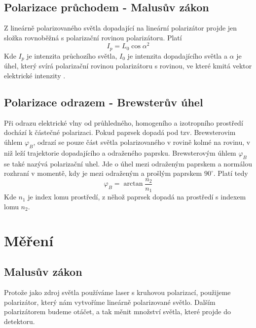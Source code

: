 \documentclass{article}
\begin{document}
\subsection*{Polarizace průchodem - Malusův zákon}
Z lineárně polarizovaného světla dopadající na lineární polarizátor projde jen složka rovnoběžná s polarizační rovinou polarizátoru.
Platí
\begin{equation}
    I_p=L_0\cos{\alpha}^2
    \label{malus}
\end{equation}
Kde \(I_p\) je intenzita průchozího světla, \(I_0\) je intenzita dopadajícího světla a \(\alpha\) je úhel, který svírá polarizační rovinou polarizátoru s rovinou, ve které kmitá vektor elektrické intenzity .

\subsection*{Polarizace odrazem - Brewsterův úhel}
Při odrazu elektrické vlny od průhledného, homogeního a izotropního prostředí dochází k částečné polarizaci.
Pokud paprsek dopadá pod tzv. Brewsterovim úhlem \(\varphi_B\), odrazí se pouze část světla polarizovaného v rovině kolmé na rovinu, v niž leží trajektorie dopadajícího a odraženého paprsku.
Brewsterovým úhlem \(\varphi_B\) se také nazývá polarizační uhel. 
Jde o úhel mezi odraženým paprskem a normálou rozhraní v momentě, kdy je mezi odraženým a prošlým paprskem \(90^\circ\).
Platí tedy
\begin{equation}
    \varphi_B=\arctan{\frac{n_2}{n_1}}
    \label{brews}
\end{equation}
Kde \(n_1\) je index lomu prostředí, z něhož paprsek dopadá na prostředí s indexem lomu \(n_2\).

\section{Měření}
\subsection*{Malusův zákon}
Protože jako zdroj světla používáme laser s kruhovou polarizací, použijeme polarizátor, který nám vytvoříme lineárně polarizované světlo.
Dalším polarizátorem budeme otáčet, a tak měnit množství světla, které projde do detektoru.
\end{document}
